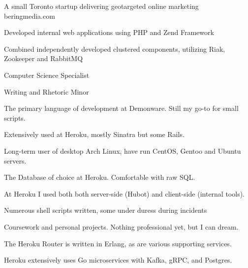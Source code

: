 \documentclass[letterpaper,11pt,notitlepage]{article}
\begin{document}
    \companydescurl
    {A small Toronto startup delivering geotargeted online marketing}
    {beringmedia.com} \\
        \begin{employment}
            \item Developed internal web applications using PHP and Zend
            Framework
            \item Combined independently developed clustered components,
            utilizing Riak, Zookeeper and RabbitMQ
        \end{employment}
\vbar{}
    \begin{employment}
        \item Computer Science Specialist
        \item Writing and Rhetoric Minor
    \end{employment}
\newpage
{}
\begin{description}[topsep=0mm,noitemsep]
  \item[Python] The primary language of development at Demonware. Still my go-to
    for small scripts.
  \item[Ruby] Extensively used at Heroku, mostly Sinatra but some Rails.
  \item[Linux] Long-term user of desktop Arch Linux, have run CentOS,
    Gentoo and Ubuntu servers.
  \item[PostgresQL] The Database of choice at Heroku. Comfortable with raw SQL.
  \item[Javascript] At Heroku I used both both server-side (Hubot)
    and client-side (internal tools).
  \item[Shell Scripting] Numerous shell scripts written, some under duress during incidents
  \item[Haskell] Coursework and personal projects. Nothing professional yet, but I
    can dream.
  \item[Erlang] The Heroku Router is written in Erlang, as are various supporting services.
  \item[Go] Heroku extensively uses Go microservices with Kafka, gRPC, and Postgres.
\end{description}
\end{document}
